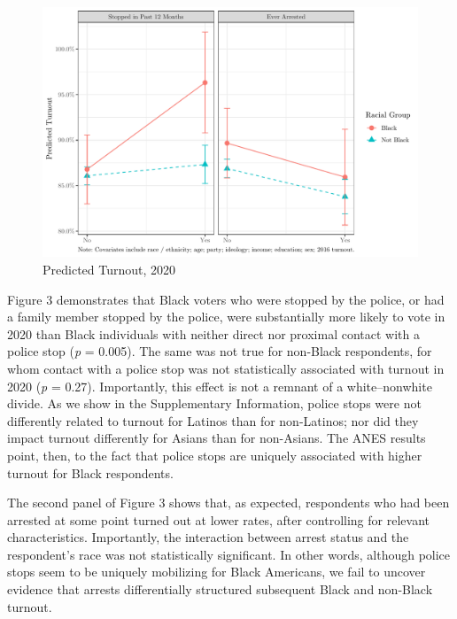 \documentclass[
  12pt,
]{article}
\begin{document}
\begin{figure}[!htpb]

{\centering \includegraphics{draft_paper_files/figure-latex/anes-cross-1} 

}

\caption{\label{fig:anes}Predicted Turnout, 2020}\label{fig:anes-cross}
\end{figure}

Figure 3 demonstrates that Black voters who were stopped by the police, or had a family member stopped by the police, were substantially more likely to vote in 2020 than Black individuals with neither direct nor proximal contact with a police stop (\emph{p} = 0.005). The same was not true for non-Black respondents, for whom contact with a police stop was not statistically associated with turnout in 2020 (\emph{p} = 0.27). Importantly, this effect is not a remnant of a white--nonwhite divide. As we show in the Supplementary Information, police stops were not differently related to turnout for Latinos than for non-Latinos; nor did they impact turnout differently for Asians than for non-Asians. The ANES results point, then, to the fact that police stops are uniquely associated with higher turnout for Black respondents.

The second panel of Figure 3 shows that, as expected, respondents who had been arrested at some point turned out at lower rates, after controlling for relevant characteristics. Importantly, the interaction between arrest status and the respondent's race was not statistically significant. In other words, although police stops seem to be uniquely mobilizing for Black Americans, we fail to uncover evidence that arrests differentially structured subsequent Black and non-Black turnout.
\end{document}
